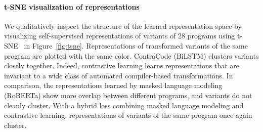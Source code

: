 \documentclass[11pt]{article}
\newcommand{\ours}[0]{ContraCode}
\begin{document}
\paragraph{t-SNE visualization of representations} We qualitatively inspect the structure of the learned representation space by visualizing self-supervised representations of variants of 28 programs using t-SNE~\citep{tsne2008} in Figure~\ref{fig:tsne}. Representations of transformed variants of the same program are plotted with the same color. \ours{} (BiLSTM) clusters variants closely together. Indeed, contrastive learning learns representations that are invariant to a wide class of automated compiler-based transformations. In comparison, the representations learned by masked language modeling (RoBERTa) show more overlap between different programs, and variants do not cleanly cluster. With a hybrid loss combining masked language modeling and contrastive learning, representations of variants of the same program once again cluster.

 
\end{document}
